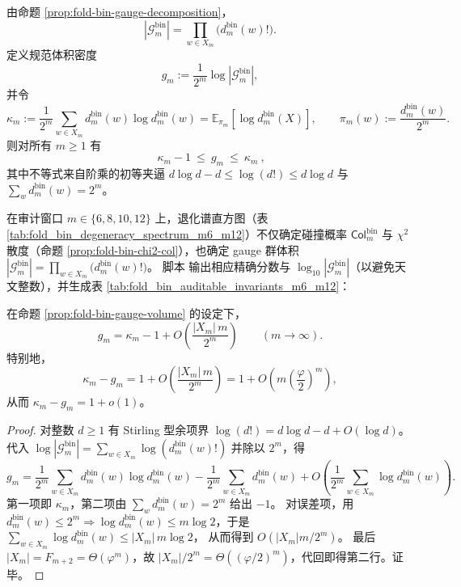 \begin{proposition}\label{prop:fold-bin-gauge-volume}
由命题 \ref{prop:fold-bin-gauge-decomposition}，
\[
|\mathcal{G}^{\mathrm{bin}}_m|
=\prod_{w\in X_m}\bigl(d^{\mathrm{bin}}_m(w)!\bigr).
\]
定义规范体积密度
\[
g_m:=\frac{1}{2^m}\log|\mathcal{G}^{\mathrm{bin}}_m|,
\]
并令
\[
\kappa_m:=\frac{1}{2^m}\sum_{w\in X_m}d^{\mathrm{bin}}_m(w)\log d^{\mathrm{bin}}_m(w)
=\mathbb{E}_{\pi_m}[\log d^{\mathrm{bin}}_m(X)],
\qquad
\pi_m(w):=\frac{d^{\mathrm{bin}}_m(w)}{2^m}.
\]
则对所有 \(m\ge 1\) 有
\[
\boxed{\ \kappa_m-1\ \le\ g_m\ \le\ \kappa_m\ },
\]
其中不等式来自阶乘的初等夹逼
\(
d\log d-d\le \log(d!)\le d\log d
\)
与 \(\sum_w d^{\mathrm{bin}}_m(w)=2^m\)。
\end{proposition}

\begin{remark}\label{rem:fold-bin-auditable-invariants}
在审计窗口 \(m\in\{6,8,10,12\}\) 上，退化谱直方图（表 \ref{tab:fold_bin_degeneracy_spectrum_m6_m12}）不仅确定碰撞概率
\(\mathsf{Col}^{\mathrm{bin}}_m\) 与 \(\chi^2\) 散度（命题 \ref{prop:fold-bin-chi2-col}），也确定 gauge 群体积
\(
|\mathcal{G}^{\mathrm{bin}}_m|
=\prod_{w\in X_m}\bigl(d^{\mathrm{bin}}_m(w)!\bigr)
\)。
脚本 \texttt{} 输出相应精确分数与 \(\log_{10}|\mathcal{G}^{\mathrm{bin}}_m|\)（以避免天文整数），并生成表 \ref{tab:fold_bin_auditable_invariants_m6_m12}：

\end{remark}

\begin{theorem}\label{thm:fold-bin-gauge-volume-stirling}
在命题 \ref{prop:fold-bin-gauge-volume} 的设定下，
\[
g_m=\kappa_m-1+O\!\left(\frac{|X_m|\,m}{2^m}\right)\qquad(m\to\infty).
\]
特别地，
\[
\kappa_m-g_m
=1+O\!\left(\frac{|X_m|\,m}{2^m}\right)
=1+O\!\left(m\left(\frac{\varphi}{2}\right)^m\right),
\]
从而 \(\kappa_m-g_m=1+o(1)\)。
\end{theorem}
\begin{proof}
对整数 \(d\ge 1\) 有 Stirling 型余项界
\(
\log(d!)=d\log d-d+O(\log d)
\)。
代入
\(
\log|\mathcal{G}^{\mathrm{bin}}_m|
=\sum_{w\in X_m}\log(d^{\mathrm{bin}}_m(w)!)
\)
并除以 \(2^m\)，得
\[
g_m
=\frac{1}{2^m}\sum_{w\in X_m}d^{\mathrm{bin}}_m(w)\log d^{\mathrm{bin}}_m(w)
-\frac{1}{2^m}\sum_{w\in X_m}d^{\mathrm{bin}}_m(w)
 +O\!\left(\frac{1}{2^m}\sum_{w\in X_m}\log d^{\mathrm{bin}}_m(w)\right).
\]
第一项即 \(\kappa_m\)，第二项由 \(\sum_w d^{\mathrm{bin}}_m(w)=2^m\) 给出 \(-1\)。
对误差项，用 \(d^{\mathrm{bin}}_m(w)\le 2^m\Rightarrow \log d^{\mathrm{bin}}_m(w)\le m\log 2\)，于是
\(
\sum_{w\in X_m}\log d^{\mathrm{bin}}_m(w)\le |X_m|\,m\log 2
\)，
从而得到 \(O(|X_m|m/2^m)\)。
最后 \(|X_m|=F_{m+2}=\Theta(\varphi^m)\)，故 \(|X_m|/2^m=\Theta((\varphi/2)^m)\)，代回即得第二行。证毕。
\end{proof}

